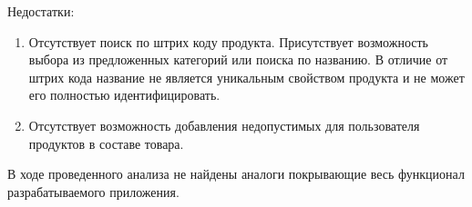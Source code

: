 Недостатки:
\begin{enumerate}
	\item Отсутствует поиск по штрих коду продукта. Присутствует возможность выбора из предложенных категорий или поиска по названию. В отличие от штрих кода название не является уникальным свойством продукта и не может его полностью идентифицировать. 
	\item Отсутствует возможность добавления недопустимых для пользователя продуктов в составе товара.
\end{enumerate}

В ходе проведенного анализа не найдены аналоги покрывающие весь функционал разрабатываемого приложения. 







\clearpage